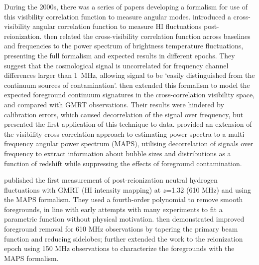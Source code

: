 During the 2000s, there was a series of papers developing a formalism for use of this visibility correlation function to measure angular modes.
\cite{bharadwaj01} introduced a cross-visibility angular correlation function to measure HI fluctuations post-reionization.
\cite{bharadwaj05} then related the cross-visibility correlation function across baselines and frequencies to the power spectrum of brightness temperature fluctuations, presenting the full formalism and expected results in different epochs. They suggest that the cosmological signal is uncorrelated for frequency channel differences larger than 1~MHz, allowing signal to be `easily distinguished from the continuum sources of contamination'.
\cite{ali08} then extended this formalism to model the expected foreground continuum signatures in the cross-correlation visibility space, and compared with GMRT observations. Their results were hindered by calibration errors, which caused decorrelation of the signal over frequency, but presented the first application of this technique to data.
\cite{datta07} provided an extension of the visibility cross-correlation approach to estimating power spectra to a multi-frequency angular power spectrum (MAPS), utilising decorrelation of signals over frequency to extract information about bubble sizes and distributions as a function of redshift while suppressing the effects of foreground contamination.

\cite{ghosh11} published the first measurement of post-reionization neutral hydrogen fluctuations with GMRT (HI intensity mapping) at $z$=1.32 (610 MHz) and using the MAPS formalism.
They used a fourth-order polynomial to remove smooth foregrounds, in line with early attempts with many experiments to fit a parametric function without physical motivation.
\cite{ghosh11a} then demonstrated improved foreground removal for 610 MHz observations by tapering the primary beam function and reducing sidelobes;
\cite{ghosh12} further extended the work to the reionization epoch using 150 MHz observations to characterize the foregrounds with the MAPS formalism.

